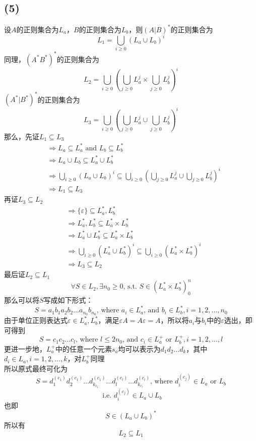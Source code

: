 \documentclass[UTF8]{ctexart}
\begin{document}
\subsection*{(5)}
设$A$的正则集合为$L_a$，$B$的正则集合为$L_b$，则$(A\big| B)^*$的正则集合为
$$L_1=\bigcup_{i\geq 0}{(L_a\cup L_b)^i}$$
同理，$(A^*B^*)^*$的正则集合为
$$L_2=\bigcup_{i\geq 0}{\left(\bigcup_{j\geq 0}{L_a^j}\times\bigcup_{j\geq 0}{L_b^j}\right)^i}$$
$(A^*\big|B^*)^*$的正则集合为
$$L_3=\bigcup_{i\geq 0}{\left(\bigcup_{j\geq 0}{L_a^j}\cup\bigcup_{j\geq 0}{L_b^j}\right)^i}$$
那么，先证$L_1\subseteq L_3$ \\
\begin{align*}
    &\Rightarrow L_a\subseteq L_a^*\text{ and } L_b\subseteq L_b^* \\
    &\Rightarrow L_a\cup L_b \subseteq L_a^*\cup L_b^* \\
    &\Rightarrow \bigcup_{i\geq 0}{(L_a\cup L_b)^i} \subseteq 
        \bigcup_{i\geq 0}{\left(\bigcup_{j\geq 0}{L_a^j}\cup\bigcup_{j\geq 0}{L_b^j}\right)^i} \\
    &\Rightarrow L_1\subseteq L_3
\end{align*}
再证$L_3\subseteq L_2$
\begin{align*}
    &\Rightarrow \{\varepsilon\}\subseteq L_a^*, L_b^* \\
    &\Rightarrow L_a^*, L_b^*\subseteq L_a^*\times L_b^* \\
    &\Rightarrow L_a^*\cup L_b^*\subseteq L_a^*\times L_b^* \\
    &\Rightarrow \bigcup_{i\geq 0}{\left(L_a^*\cup L_b^*\right)^i}
        \subseteq \bigcup_{i\geq 0}{\left(L_a^*\times L_b^*\right)^i} \\
    &\Rightarrow L_3\subseteq L_2
\end{align*}
最后证$L_2\subseteq L_1$
$$
\forall S\in L_2, \exists n_0 \geq 0\text{, s.t. }S\in \left(L_a^*\times L_b^*\right)^n_0
$$
那么可以将$S$写成如下形式：
$$
S=a_1b_1a_2b_2\dots a_{n_0}b_{n_0}\text{, where } a_{i}\in L_a^*\text{, and }b_{i}\in L_b^*, i=1, 2, \dots, n_0
$$
由于单位正则表达式$\varepsilon\in L_a^*, L_b^*$，满足$\varepsilon A=A\varepsilon = A$，所以将$a_i$与$b_i$中的$\varepsilon$选出，即可得到
$$
S=c_1c_2\dots c_l\text{, where }l \leq 2n_0 \text{, and } c_i\in L_a^+\text{ or }L_b^+, i=1,2,\dots,l
$$
更进一步地，$L_a^+$中的任意一个元素$s_a$均可以表示为$d_1d_2\dots d_k$，其中$d_i\in L_a, i=1,2,\dots,k$，对$L_b^+$同理 \\
所以原式最终可化为
$$
S=d_1^{(c_1)}d_2^{(c_1)}\dots d_{k_{c_1}}^{(c_1)}\dots d_l^{(c_l)}\dots d_{k_{c_l}}^{(c_l)}\text{, where } d_i^{(c_j)}\in L_a \text{ or } L_b 
$$
$$
\text{ i.e. } d_i^{(c_j)}\in L_a \cup L_b
$$
也即
$$S\in (L_a\cup L_b)^*$$
所以有
$$L_2\subseteq L_1$$
\end{document}
